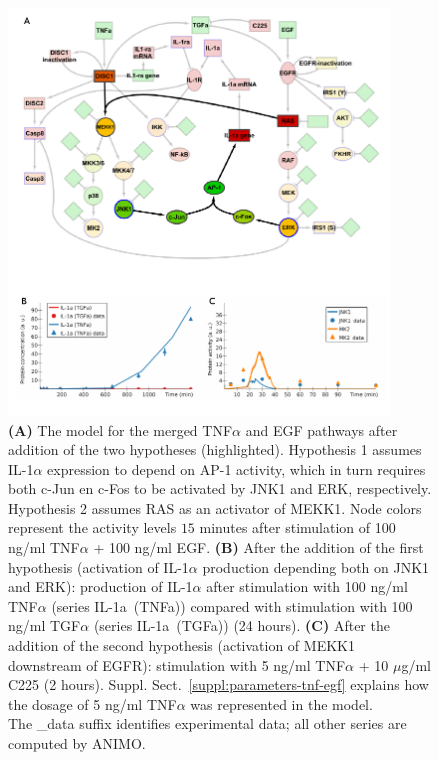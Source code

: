 \documentclass{bmcart}
\begin{document}
\begin{figure}[!htpb]
\begin{center}
  \includegraphics[width=0.9\textwidth]{images/large_network_legendg_oneImage}
\end{center}
\caption{
{\bf(A)} %
The model for the merged TNF$\alpha$ and EGF pathways
after addition of the two hypotheses (highlighted).
Hypothesis 1 assumes IL-1$\alpha$ expression to depend on AP-1 activity, which in turn requires
both c-Jun en c-Fos to be activated by JNK1 and ERK, respectively. Hypothesis 2 assumes RAS as an activator
of MEKK1. Node colors represent the activity levels $15$ minutes
after stimulation of 100 ng/ml TNF$\alpha$ + 100 ng/ml EGF.
{\bf(B)} %
After the addition of the first hypothesis (activation of IL-1$\alpha$ production depending both
on JNK1 and ERK): production of IL-1$\alpha$ after stimulation with 100 ng/ml TNF$\alpha$ (series {\sf IL-1a~(TNFa)})
compared with stimulation with 100 ng/ml TGF$\alpha$ (series {\sf IL-1a~(TGFa)}) (24 hours).
{\bf(C)} %
After the addition of the second hypothesis (activation of MEKK1 downstream of EGFR):
stimulation with 5 ng/ml TNF$\alpha$ + 10 $\mu$g/ml C225 (2 hours).
Suppl. Sect.~\ref{suppl:parameters-tnf-egf} explains how the dosage of 5 ng/ml TNF$\alpha$ was represented in the model.\\
The {\sf \_{}data} suffix identifies experimental data; all other series are computed by ANIMO.}\label{fig:large-model-complete}
\end{figure}
\end{document}
